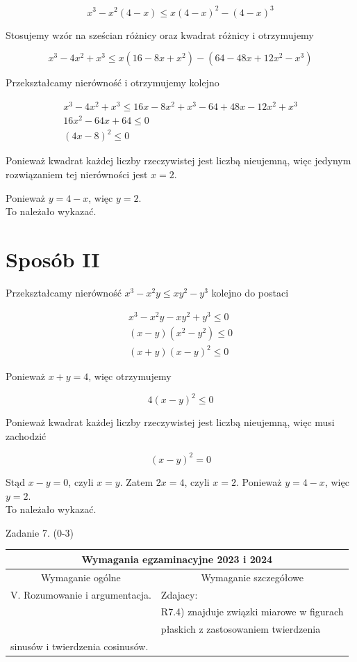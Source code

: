 \documentclass[10pt]{article}
\begin{document}
$$
x^{3}-x^{2}(4-x) \leq x(4-x)^{2}-(4-x)^{3}
$$

Stosujemy wzór na sześcian różnicy oraz kwadrat różnicy i otrzymujemy

$$
x^{3}-4 x^{2}+x^{3} \leq x\left(16-8 x+x^{2}\right)-\left(64-48 x+12 x^{2}-x^{3}\right)
$$

Przekształcamy nierówność i otrzymujemy kolejno

$$
\begin{gathered}
x^{3}-4 x^{2}+x^{3} \leq 16 x-8 x^{2}+x^{3}-64+48 x-12 x^{2}+x^{3} \\
16 x^{2}-64 x+64 \leq 0 \\
(4 x-8)^{2} \leq 0
\end{gathered}
$$

Ponieważ kwadrat każdej liczby rzeczywistej jest liczbą nieujemną, więc jedynym rozwiązaniem tej nierówności jest $x=2$.

Ponieważ $y=4-x$, więc $y=2$.\\
To należało wykazać.

\section*{Sposób II}
Przekształcamy nierówność $x^{3}-x^{2} y \leq x y^{2}-y^{3}$ kolejno do postaci

$$
\begin{gathered}
x^{3}-x^{2} y-x y^{2}+y^{3} \leq 0 \\
(x-y)\left(x^{2}-y^{2}\right) \leq 0 \\
(x+y)(x-y)^{2} \leq 0
\end{gathered}
$$

Ponieważ $x+y=4$, więc otrzymujemy

$$
4(x-y)^{2} \leq 0
$$

Ponieważ kwadrat każdej liczby rzeczywistej jest liczbą nieujemną, więc musi zachodzić

$$
(x-y)^{2}=0
$$

Stąd $x-y=0$, czyli $x=y$. Zatem $2 x=4$, czyli $x=2$. Ponieważ $y=4-x$, więc $y=2$.\\
To należało wykazać.

Zadanie 7. (0-3)

\begin{center}
\begin{tabular}{|l|l|}
\hline
\multicolumn{2}{|c|}{Wymagania egzaminacyjne 2023 i 2024} \\
\hline
\multicolumn{1}{|c|}{Wymaganie ogólne} & \multicolumn{1}{c|}{Wymaganie szczegółowe} \\
\hline
V. Rozumowanie i argumentacja. & Zdajacy: \\
 & R7.4) znajduje związki miarowe w figurach \\
 & płaskich z zastosowaniem twierdzenia \\
sinusów i twierdzenia cosinusów. &  \\
\hline
\end{tabular}
\end{center}
\end{document}
